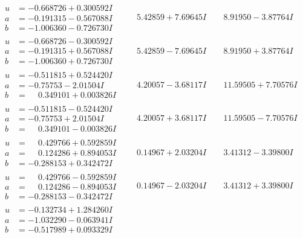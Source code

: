 \documentclass[1p]{elsarticle_modified}
\theoremstyle{definition}
\begin{document}
$$\begin{array}{c|c|c}
\begin{aligned}
u &= -0.668726 + 0.300592 I \\
a &= -0.191315 - 0.567088 I \\
b &= -1.006360 - 0.726730 I\end{aligned}
 & \phantom{-}5.42859 + 7.69645 I & \phantom{-}8.91950 - 3.87764 I \\ \hline\begin{aligned}
u &= -0.668726 - 0.300592 I \\
a &= -0.191315 + 0.567088 I \\
b &= -1.006360 + 0.726730 I\end{aligned}
 & \phantom{-}5.42859 - 7.69645 I & \phantom{-}8.91950 + 3.87764 I \\ \hline\begin{aligned}
u &= -0.511815 + 0.524420 I \\
a &= -0.75753 - 2.01504 I \\
b &= \phantom{-}0.349101 + 0.003826 I\end{aligned}
 & \phantom{-}4.20057 - 3.68117 I & \phantom{-}11.59505 + 7.70576 I \\ \hline\begin{aligned}
u &= -0.511815 - 0.524420 I \\
a &= -0.75753 + 2.01504 I \\
b &= \phantom{-}0.349101 - 0.003826 I\end{aligned}
 & \phantom{-}4.20057 + 3.68117 I & \phantom{-}11.59505 - 7.70576 I \\ \hline\begin{aligned}
u &= \phantom{-}0.429766 + 0.592859 I \\
a &= \phantom{-}0.124286 + 0.894053 I \\
b &= -0.288153 + 0.342472 I\end{aligned}
 & \phantom{-}0.14967 + 2.03204 I & \phantom{-}3.41312 - 3.39800 I \\ \hline\begin{aligned}
u &= \phantom{-}0.429766 - 0.592859 I \\
a &= \phantom{-}0.124286 - 0.894053 I \\
b &= -0.288153 - 0.342472 I\end{aligned}
 & \phantom{-}0.14967 - 2.03204 I & \phantom{-}3.41312 + 3.39800 I \\ \hline\begin{aligned}
u &= -0.132734 + 1.284260 I \\
a &= -1.032290 - 0.063941 I \\
b &= -0.517989 + 0.093329 I\end{aligned}

\end{array}$$
\end{document}
